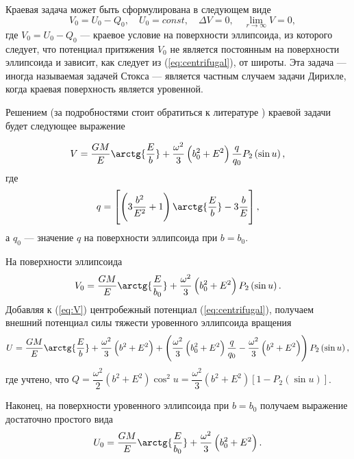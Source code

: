 \documentclass[11pt, a4paper,addpoints]{exam}
\theoremstyle{remark}
\begin{document}
Краевая задача может быть сформулирована в следующем виде
\begin{equation}
    \quad V_0 = U_0 - Q_0,\quad U_0 = const,\quad \Delta V = 0,\quad \lim\limits_{r\to\infty} V = 0,
    \label{eq:bvp}
\end{equation}
где $V_0 = U_0 - Q_0$ --- краевое условие на поверхности эллипсоида, из которого следует, что потенциал притяжения $V_0$ не
является постоянным на поверхности эллипсоида и зависит, как следует из (\ref{eq:centrifugal}), от
широты. Эта задача --- иногда называемая задачей Стокса --- является частным случаем задачи Дирихле, когда краевая поверхность является
уровенной.

Решением (за подробностями стоит обратиться к литературе \cite{Moritz2007,Ogorodova2006}) краевой
задачи будет следующее выражение

\begin{equation}
    V = \dfrac{GM}{E} \arctg{\dfrac{E}{b}} + \dfrac{\omega^2}{3} \left( b_0^2 + E^2 \right)
    \dfrac{q}{q_0} P_2 \left( \sin{u} \right),
    \label{eq:V}
\end{equation}
где
\begin{equation}
    q = \left[ \left( 3\dfrac{b^2}{E^2} + 1 \right)\arctg{\dfrac{E}{b}} - 3\dfrac{b}{E} \right],
    \label{eq:q}
\end{equation}
а $q_0$ --- значение $q$ на поверхности эллипсоида при $b=b_0$.

На поверхности эллипсоида 
\begin{equation}
    V_0 = \dfrac{GM}{E} \arctg{\dfrac{E}{b_0}} + \dfrac{\omega^2}{3} \left( b_0^2 + E^2 \right)
    P_2 \left( \sin{u} \right).
    \label{eq:V0}
\end{equation}
Добавляя к (\ref{eq:V}) центробежный потенциал (\ref{eq:centrifugal}), получаем внешний потенциал
силы тяжести уровенного эллипсоида вращения
\begin{equation}
    U = \dfrac{GM}{E} \arctg{\dfrac{E}{b}} + 
    \dfrac{\omega^2}{3} \left( b^2 + E^2 \right) +
    \left(\dfrac{\omega^2}{3} \left( b_0^2 + E^2 \right)\dfrac{q}{q_0} -
    \dfrac{\omega^2}{3} \left( b^2 + E^2 \right)
    \right) P_2 \left( \sin{u} \right),
    \label{eq:U}
\end{equation}
где учтено, что $Q = \dfrac{\omega^2}{2}\left( b^2 + E^2 \right)\cos^2{u} =
\dfrac{\omega^2}{3} \left( b^2 + E^2 \right)\left[ 1 - P_2\left( \sin{u} \right) \right]$.

Наконец, на поверхности уровенного эллипсоида при $b = b_0$ получаем выражение достаточно простого вида
\begin{equation}
    U_0 = \dfrac{GM}{E} \arctg{\dfrac{E}{b_0}} + 
    \dfrac{\omega^2}{3} \left( b_0^2 + E^2 \right).
    \label{eq:U0}
\end{equation}
\end{document}
